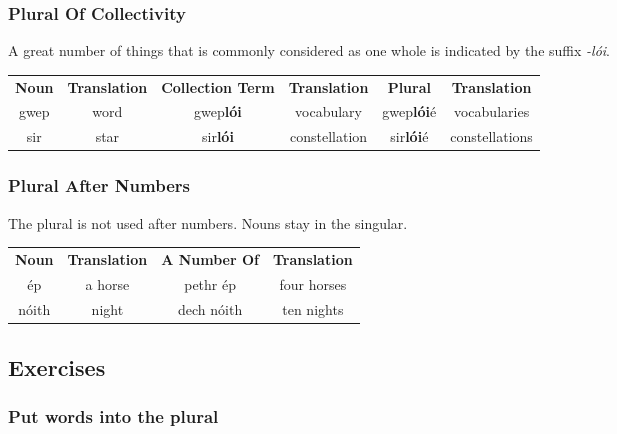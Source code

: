 \subsubsection{Plural Of Collectivity}

A great number of things that is commonly considered as one whole is indicated by the suffix \textit{-l\'{o}i}.
\begin{table}[H]
\centering
\begin{tabular}{cccccc}
  \toprule
  \textbf{Noun} & \textbf{Translation} & \textbf{Collection Term} & \textbf{Translation} & \textbf{Plural} & \textbf{Translation}\\
  \cmidrule(lr){1-1}\cmidrule(lr){2-2}\cmidrule(lr){3-3}\cmidrule(lr){4-4}\cmidrule(lr){5-5}\cmidrule(lr){6-6}
  gwep & word & gwep\textbf{l\'{o}i} & vocabulary & gwep\textbf{l\'{o}i}\'{e} & vocabularies\\
  sir & star & sir\textbf{l\'{o}i} & constellation & sir\textbf{l\'{o}i}\'{e} & constellations\\
  \bottomrule
\end{tabular}
\label{example_plural_one_whole}
\end{table}

\subsubsection{Plural After Numbers}

The plural is not used after numbers. Nouns stay in the singular.
\begin{table}[H]
\centering
\begin{tabular}{cccc}
  \toprule
  \textbf{Noun} & \textbf{Translation} & \textbf{A Number Of} & \textbf{Translation}\\
  \cmidrule(lr){1-1}\cmidrule(lr){2-2}\cmidrule(lr){3-3}\cmidrule(lr){4-4}
  \'{e}p & a horse & pethr \'{e}p & four horses\\
  n\'{o}ith & night & dech n\'{o}ith & ten nights\\
  \bottomrule
\end{tabular}
\label{example_plural_one_whole}
\end{table}

\newpage
\subsection{Exercises}

\subsubsection{Put words into the plural}

